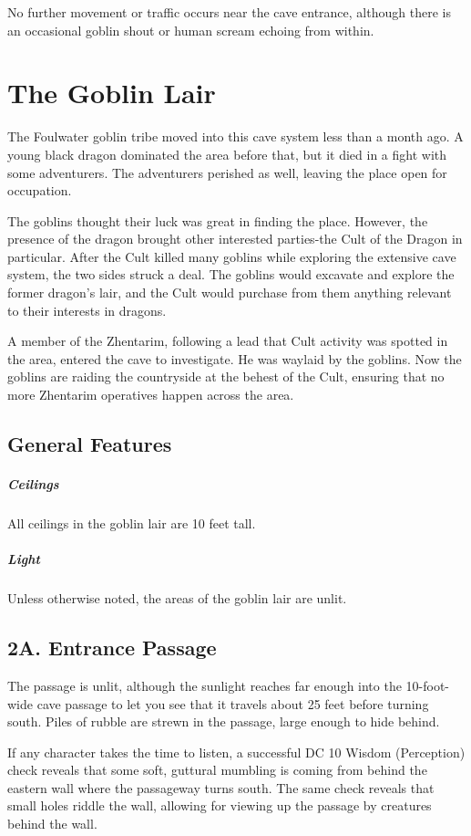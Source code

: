 \documentclass[10pt,a4paper,twoside,bg=print,twocolumn,openany,nodeprecatedcode]{dndbook}
\begin{document}
No further movement or traffic occurs near the cave entrance, although there is an occasional goblin shout or human scream echoing from within.

\section{The Goblin Lair}
The Foulwater goblin tribe moved into this cave system less than a month ago. A young black dragon dominated the area before that, but it died in a fight with some adventurers. The adventurers perished as well, leaving the place open for occupation.

The goblins thought their luck was great in finding the place. However, the presence of the dragon brought other interested parties-the Cult of the Dragon in particular. After the Cult killed many goblins while exploring the extensive cave system, the two sides struck a deal. The goblins would excavate and explore the former dragon's lair, and the Cult would purchase from them anything relevant to their interests in dragons.

A member of the Zhentarim, following a lead that Cult activity was spotted in the area, entered the cave to investigate. He was waylaid by the goblins. Now the goblins are raiding the countryside at the behest of the Cult, ensuring that no more Zhentarim operatives happen across the area.

\subsection{General Features}
\subparagraph{Ceilings}
All ceilings in the goblin lair are 10 feet tall.

\subparagraph{Light}
Unless otherwise noted, the areas of the goblin lair are unlit.

\subsection{2A. Entrance Passage}
\begin{DndReadAloud}{}
The passage is unlit, although the sunlight reaches far enough into the 10-foot-wide cave passage to let you see that it travels about 25 feet before turning south. Piles of rubble are strewn in the passage, large enough to hide behind.

\end{DndReadAloud}

If any character takes the time to listen, a successful DC 10 Wisdom (Perception) check reveals that some soft, guttural mumbling is coming from behind the eastern wall where the passageway turns south. The same check reveals that small holes riddle the wall, allowing for viewing up the passage by creatures behind the wall.
\end{document}

